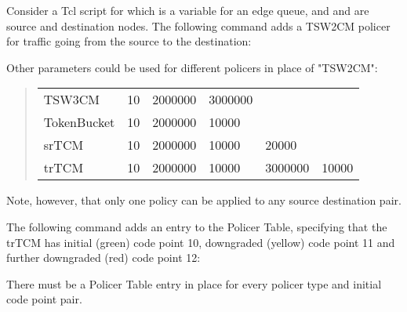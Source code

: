 Consider a Tcl script for which 
   is a variable for an edge queue, 
  and  and  are source and destination nodes.   
The following command adds a TSW2CM policer for traffic going from 
  the source to the destination:


Other parameters could be used for different policers 
  in place of "TSW2CM":

\begin{quote}
\begin{tabular}{llllll}
TSW3CM&10&2000000&3000000\\
TokenBucket&10&2000000&10000\\
srTCM&10&2000000&10000&20000\\
trTCM&10&2000000&10000&3000000&10000
\end{tabular}
\end{quote}

Note, however, 
  that only one policy can be applied to any source destination pair.

The following command adds an entry to the Policer Table, 
  specifying that the trTCM has
  initial (green) code point 10, downgraded (yellow) code point 11 
  and further downgraded (red) code point 12:


There must be a Policer Table entry in place for every 
policer type and initial code point pair.


